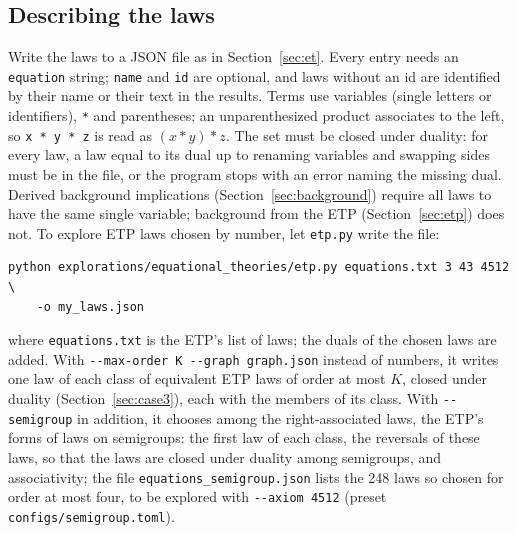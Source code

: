 \documentclass[11pt,a4paper]{article}
\theoremstyle{definition}
\theoremstyle{remark}
\newcommand{\code}[1]{\texttt{#1}}
\begin{document}
\subsection{Describing the laws}

Write the laws to a JSON file as in Section~\ref{sec:et}. Every entry needs an \code{equation} string; \code{name} and \code{id} are optional, and laws without an id are identified by their name or their text in the results. Terms use variables (single letters or identifiers), \code{*} and parentheses; an unparenthesized product associates to the left, so \code{x * y * z} is read as $(x * y) * z$. The set must be closed under duality: for every law, a law equal to its dual up to renaming variables and swapping sides must be in the file, or the program stops with an error naming the missing dual. Derived background implications (Section~\ref{sec:background}) require all laws to have the same single variable; background from the ETP (Section~\ref{sec:etp}) does not. To explore ETP laws chosen by number, let \code{etp.py} write the file:
\begin{Verbatim}
python explorations/equational_theories/etp.py equations.txt 3 43 4512 \
    -o my_laws.json
\end{Verbatim}
where \code{equations.txt} is the ETP's list of laws; the duals of the chosen laws are added. With \code{-{}-max-order K -{}-graph graph.json} instead of numbers, it writes one law of each class of equivalent ETP laws of order at most $K$, closed under duality (Section~\ref{sec:case3}), each with the members of its class. With \code{-{}-semigroup} in addition, it chooses among the right-associated laws, the ETP's forms of laws on semigroups: the first law of each class, the reversals of these laws, so that the laws are closed under duality among semigroups, and associativity; the file \code{equations\_semigroup.json} lists the 248 laws so chosen for order at most four, to be explored with \code{-{}-axiom 4512} (preset \code{configs/semigroup.toml}).
\end{document}
